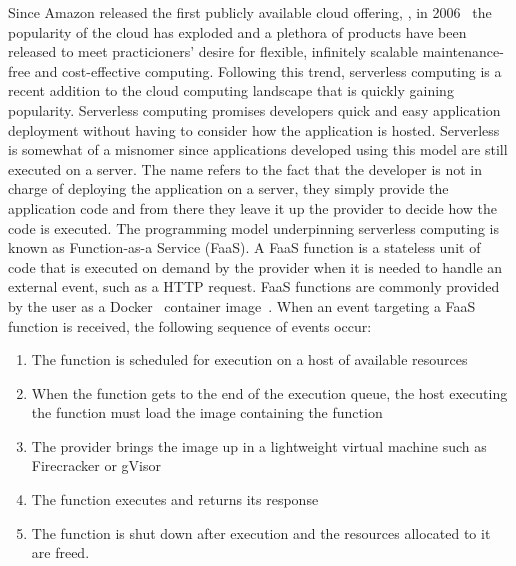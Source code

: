 \documentclass[../main.tex]{subfiles}
\begin{document}
\begin{refsection}
Since Amazon released the first publicly available cloud offering,
, in 2006~\cite{qian2009cloud} the popularity of
the cloud has exploded and a plethora of products have been released
to meet practicioners' desire for flexible, infinitely scalable
maintenance-free and cost-effective computing. Following this trend,
serverless computing is a recent addition to the cloud computing
landscape that is quickly gaining popularity. Serverless computing
promises developers quick and easy application deployment without
having to consider how the application is hosted. Serverless is
somewhat of a misnomer since applications developed using this model
are still executed on a server. The name refers to the fact that the
developer is not in charge of deploying the application on a server,
they simply provide the application code and from there they leave it
up the provider to decide how the code is executed. The programming
model underpinning serverless computing is known as Function-as-a
Service (FaaS). A FaaS function is a stateless unit of code that is
executed on demand by the provider when it is needed to handle an
external event, such as a HTTP request. FaaS functions are commonly
provided by the user as a Docker~\cite{docker} container
image~\cite{serverless_state}. When an event targeting a FaaS function
is received, the following sequence of events occur:
\begin{enumerate}
\item The function is scheduled for execution on a host of available resources
\item When the function gets to the end of the execution queue, the host executing the function must load the image containing the function
\item The provider brings the image up in a lightweight virtual machine such as Firecracker or gVisor
\item The function executes and returns its response
\item The function is shut down after execution and the resources
  allocated to it are freed.
\end{enumerate}



\end{refsection}
\end{document}
